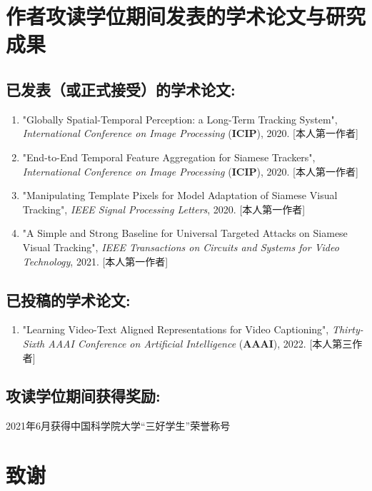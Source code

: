 \chapter{作者攻读学位期间发表的学术论文与研究成果}


\section*{已发表（或正式接受）的学术论文:}

{
\setlist[enumerate]{}%
\begin{enumerate}[nosep]
    \item "Globally Spatial-Temporal Perception: a Long-Term Tracking System", \textit{International Conference on Image Processing} (\textbf{ICIP}), 2020. [本人第一作者]
    \item "End-to-End Temporal Feature Aggregation for Siamese Trackers", \textit{International Conference on Image Processing} (\textbf{ICIP}), 2020. [本人第一作者]
    \item "Manipulating Template Pixels for Model Adaptation of Siamese Visual Tracking", \textit{IEEE Signal Processing Letters}, 2020. [本人第一作者]
    \item "A Simple and Strong Baseline for Universal Targeted Attacks on Siamese Visual Tracking", \textit{IEEE Transactions on Circuits and Systems for Video Technology}, 2021. [本人第一作者]
\end{enumerate}
}

\section*{已投稿的学术论文:}

{
\setlist[enumerate]{}%
\begin{enumerate}[nosep]
    \item "Learning Video-Text Aligned Representations for Video Captioning", \textit{Thirty-Sixth AAAI Conference on Artificial Intelligence} (\textbf{AAAI}), 2022. [本人第三作者]
\end{enumerate}
}

\section*{攻读学位期间获得奖励:}
2021年6月获得中国科学院大学“三好学生”荣誉称号

\chapter[致谢]{致\quad 谢}%
\thispagestyle{noheaderstyle}%

\cleardoublepage[plain]%
